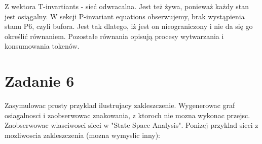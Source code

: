 \documentclass[12pt]{article}
\begin{document}
Z wektora T-invartiants - sieć odwracalna. Jest też żywa, ponieważ każdy stan jest osiągalny. W sekcji P-invariant equations obserwujemy, brak wystąpienia stanu P6, czyli bufora. Jest tak dlatego, iż jest on nieograniczony i nie da się go określić równaniem. Pozostałe równania opisują procesy wytwarzania i konsumowania tokenów.

\section{Zadanie 6}
Zasymulowac prosty przyklad ilustrujacy zakleszczenie. Wygenerowac graf osiagalnosci i zaobserwowac znakowania, z ktoroch nie mozna wykonac przejsc. Zaobserwowac wlasciwosci sieci w "State Space Analysis". Ponizej przyklad sieci z mozliwoscia zakleszczenia (mozna wymyslic inny):
\end{document}
